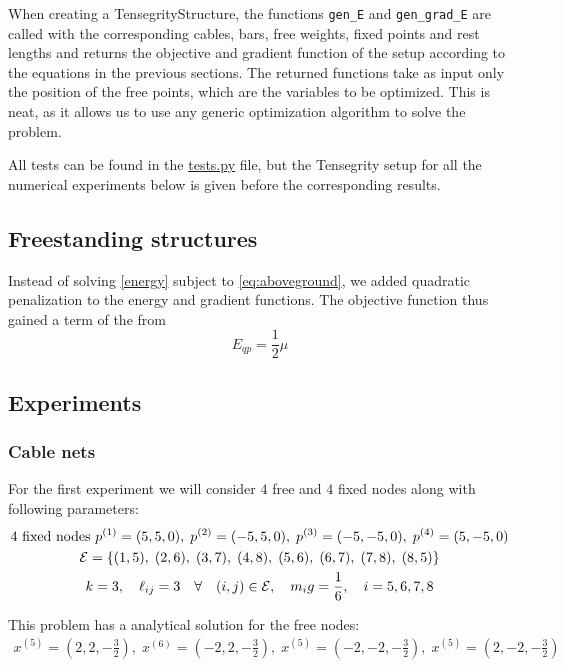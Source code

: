 When creating a TensegrityStructure, the functions \lstinline{gen_E}  and \lstinline{gen_grad_E} are called with the corresponding cables, bars, free weights, fixed points and rest lengths and returns the objective and gradient function of the setup according to the equations in the previous sections. The returned functions take as input only the position of the free points, which are the variables to be optimized. This is neat, as it allows us to use any generic optimization algorithm to solve the problem.

All tests can be found in the \href{https://github.com/otkulseng/Opt1_Project/blob/main/Kode/tests.py}{tests.py} file, but the Tensegrity setup for all the numerical experiments below is given before the corresponding results.

\subsection{Freestanding structures}
Instead of solving \eqref{energy} subject to \eqref{eq:aboveground}, we added quadratic penalization to the energy and gradient functions. The objective function thus gained a term of the from 
\begin{equation}
    E_{qp} = \frac{1}{2} \mu 
\end{equation}

\subsection{Experiments}
\subsubsection{Cable nets}
For the first experiment we will consider $4$ free and $4$ fixed nodes along with following parameters:
\begin{equation*}
\begin{gathered}
    4 \text{ fixed nodes } p^{(1)} = (5,5,0),\; p^{(2)} = (-5,5,0),\; p^{(3)} = (-5,-5,0),\; p^{(4)} = (5,-5,0) \\
    \mathcal{E} = \{(1,5),\;(2,6),\;(3,7),\;(4,8),\; (5,6),\; (6,7),\; (7,8),\; (8,5) \}\\
    k=3,\quad \ell_{ij} = 3 \quad \forall \quad (i,j) \in \mathcal{E}, \quad m_i g = \frac{1}{6}, \quad i= 5,6,7,8 
\end{gathered}
\end{equation*}

This problem has a analytical solution for the free nodes:
\begin{equation*}
    \begin{gathered}
    x^{(5)} = (2,2,-\frac{3}{2}),\;x^{(6)} = (-2,2,-\frac{3}{2}),\;x^{(5)} = (-2,-2,-\frac{3}{2}),\;x^{(5)} = (2,-2,-\frac{3}{2})
    \end{gathered}
\end{equation*}



